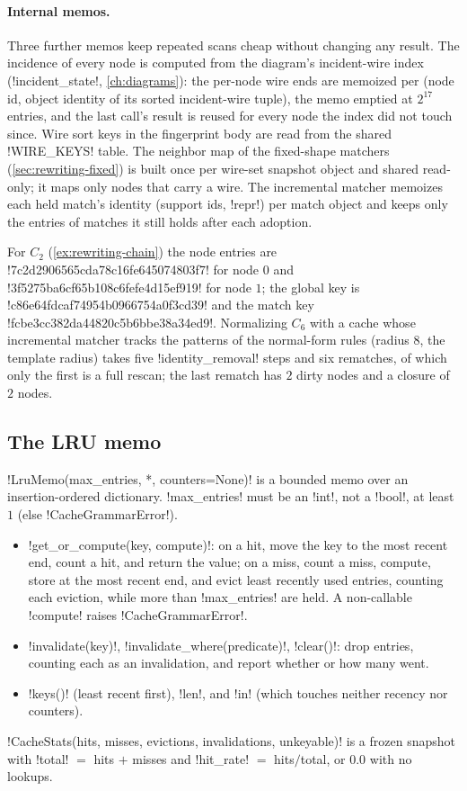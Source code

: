\paragraph{Internal memos.}
Three further memos keep repeated scans cheap without changing any result. The incidence of every
node is computed from the diagram's incident-wire index (\py!incident_state!, \cref{ch:diagrams}):
the per-node wire ends are memoized per (node id, object identity of its sorted incident-wire
tuple), the memo emptied at $2^{17}$ entries, and the last call's result is reused for every node
the index did not touch since. Wire sort keys in the fingerprint body are read from the shared
\py!WIRE_KEYS! table. The neighbor map of the fixed-shape matchers (\cref{sec:rewriting-fixed}) is
built once per wire-set snapshot object and shared read-only; it maps only nodes that carry a wire.
The incremental matcher memoizes each held match's identity (support ids, \py!repr!) per match
object and keeps only the entries of matches it still holds after each adoption.

\begin{example}\label{ex:rewriting-fp}
For $C_2$ (\cref{ex:rewriting-chain}) the node entries are \code!7c2d2906565cda78c16fe645074803f7!
for node $0$ and \code!3f5275ba6cf65b108c6fefe4d15ef919! for node $1$; the global key is
\code!c86e64fdcaf74954b0966754a0f3cd39! and the match key \code!fcbe3cc382da44820c5b6bbe38a34ed9!.
Normalizing $C_6$ with a cache whose incremental matcher tracks the patterns of the normal-form
rules (radius $8$, the template radius) takes five \code!identity_removal! steps and six rematches,
of which only the first is a full rescan; the last rematch has $2$ dirty nodes and a closure of $2$
nodes.
\end{example}

\subsection{The LRU memo}

\py!LruMemo(max_entries, *, counters=None)! is a bounded memo over an insertion-ordered dictionary.
\py!max_entries! must be an \py!int!, not a \py!bool!, at least $1$ (else \py!CacheGrammarError!).
\begin{itemize}
\item \py!get_or_compute(key, compute)!: on a hit, move the key to the most recent end, count a hit,
  and return the value; on a miss, count a miss, compute, store at the most recent end, and evict
  least recently used entries, counting each eviction, while more than \py!max_entries! are held. A
  non-callable \py!compute! raises \py!CacheGrammarError!.
\item \py!invalidate(key)!, \py!invalidate_where(predicate)!, \py!clear()!: drop entries, counting
  each as an invalidation, and report whether or how many went.
\item \py!keys()! (least recent first), \py!len!, and \py!in! (which touches neither recency nor
  counters).
\end{itemize}
\py!CacheStats(hits, misses, evictions, invalidations, unkeyable)! is a frozen snapshot with
\py!total! $=$ hits $+$ misses and \py!hit_rate! $=$ hits$/$total, or $0.0$ with no lookups.

